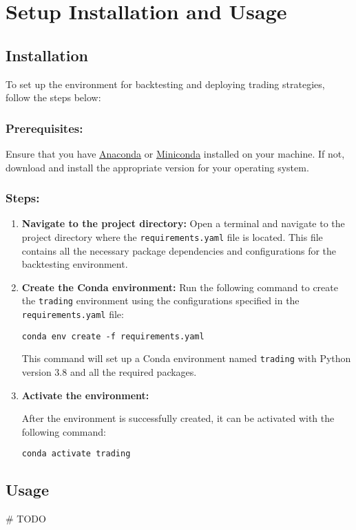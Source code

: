 \chapter{Setup Installation and Usage}

\section{Installation}

To set up the environment for backtesting and deploying trading strategies, follow the steps below:

\subsection{Prerequisites:}

Ensure that you have \href{https://www.anaconda.com/products/distribution}{Anaconda} or \href{https://docs.conda.io/en/latest/miniconda.html}{Miniconda} installed on your machine. If not, download and install the appropriate version for your operating system.

\subsection{Steps:}

\begin{enumerate}
    \item \textbf{Navigate to the project directory:}
    Open a terminal and navigate to the project directory where the \texttt{requirements.yaml} file is located. This file contains all the necessary package dependencies and configurations for the backtesting environment.

    \item \textbf{Create the Conda environment:}
    Run the following command to create the \texttt{trading} environment using the configurations specified in the \texttt{requirements.yaml} file:

\begin{verbatim}
conda env create -f requirements.yaml
\end{verbatim}
    This command will set up a Conda environment named \texttt{trading} with Python version 3.8 and all the required packages.

    \item \textbf{Activate the environment:}

    After the environment is successfully created, it can be activated with the following command:

\begin{verbatim}
conda activate trading
\end{verbatim}

\end{enumerate}

\section{Usage}

\# TODO


